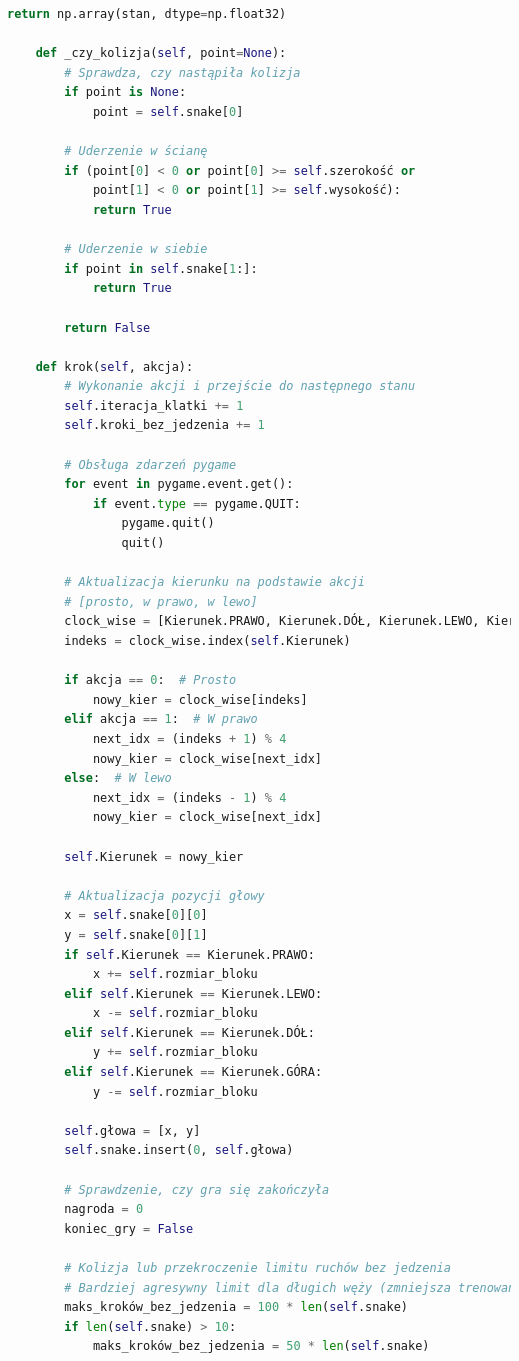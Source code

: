 \documentclass[a4paper,12pt]{article}
\begin{document}
\begin{lstlisting}[language=Python]
        return np.array(stan, dtype=np.float32)
    
    def _czy_kolizja(self, point=None):
        # Sprawdza, czy nastąpiła kolizja
        if point is None:
            point = self.snake[0]
            
        # Uderzenie w ścianę
        if (point[0] < 0 or point[0] >= self.szerokość or 
            point[1] < 0 or point[1] >= self.wysokość):
            return True
        
        # Uderzenie w siebie
        if point in self.snake[1:]:
            return True
            
        return False
    
    def krok(self, akcja):
        # Wykonanie akcji i przejście do następnego stanu
        self.iteracja_klatki += 1
        self.kroki_bez_jedzenia += 1
        
        # Obsługa zdarzeń pygame
        for event in pygame.event.get():
            if event.type == pygame.QUIT:
                pygame.quit()
                quit()
        
        # Aktualizacja kierunku na podstawie akcji
        # [prosto, w prawo, w lewo]
        clock_wise = [Kierunek.PRAWO, Kierunek.DÓŁ, Kierunek.LEWO, Kierunek.GÓRA]
        indeks = clock_wise.index(self.Kierunek)
        
        if akcja == 0:  # Prosto
            nowy_kier = clock_wise[indeks]
        elif akcja == 1:  # W prawo
            next_idx = (indeks + 1) % 4
            nowy_kier = clock_wise[next_idx]
        else:  # W lewo
            next_idx = (indeks - 1) % 4
            nowy_kier = clock_wise[next_idx]
            
        self.Kierunek = nowy_kier
        
        # Aktualizacja pozycji głowy
        x = self.snake[0][0]
        y = self.snake[0][1]
        if self.Kierunek == Kierunek.PRAWO:
            x += self.rozmiar_bloku
        elif self.Kierunek == Kierunek.LEWO:
            x -= self.rozmiar_bloku
        elif self.Kierunek == Kierunek.DÓŁ:
            y += self.rozmiar_bloku
        elif self.Kierunek == Kierunek.GÓRA:
            y -= self.rozmiar_bloku
            
        self.głowa = [x, y]
        self.snake.insert(0, self.głowa)
        
        # Sprawdzenie, czy gra się zakończyła
        nagroda = 0
        koniec_gry = False
        
        # Kolizja lub przekroczenie limitu ruchów bez jedzenia
        # Bardziej agresywny limit dla długich węży (zmniejsza trenowanie na "chodzeniu w kółko")
        maks_kroków_bez_jedzenia = 100 * len(self.snake)
        if len(self.snake) > 10:
            maks_kroków_bez_jedzenia = 50 * len(self.snake)
            

\end{lstlisting}
\end{document}
